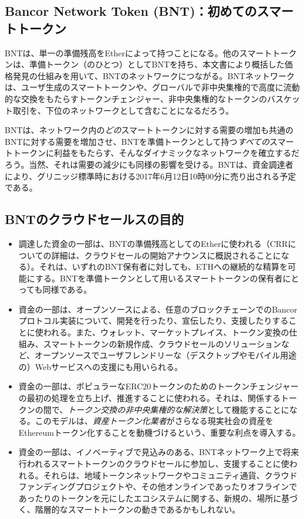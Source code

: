 \documentclass{jsarticle}
\begin{document}
  \subsection{Bancor Network Token (BNT)：初めてのスマートトークン}

  BNTは、単一の準備残高をEtherによって持つことになる。他のスマートトークンは、準備トークン（のひとつ）としてBNTを持ち、本文書により概括した価格発見の仕組みを用いて、BNTのネットワークにつながる。BNTネットワークは、ユーザ生成のスマートトークンや、グローバルで非中央集権的で高度に流動的な交換をもたらすトークンチェンジャー、非中央集権的なトークンのバスケット取引を、下位のネットワークとして含むことになるだろう。

  BNTは、ネットワーク内の\emph{どの}スマートトークンに対する需要の増加も共通のBNTに対する需要を増加させ、BNTを準備トークンとして持つ\emph{すべての}スマートトークンに利益をもたらす、そんなダイナミックなネットワークを確立するだろう。当然、それは需要の減少にも同様の影響を受ける。BNTは、資金調達者により、グリニッジ標準時における2017年6月12日10時00分に売り出される予定である。

  \subsection{BNTのクラウドセールスの目的}

  \begin{itemize}
    \item 調達した資金の一部は、BNTの準備残高としてのEtherに使われる（CRRについての詳細は、クラウドセールの開始アナウンスに概説されることになる）。それは、いずれのBNT保有者に対しても、ETHへの継続的な精算を可能にする。BNTを準備トークンとして用いるスマートトークンの保有者にとっても同様である。
    \item 資金の一部は、オープンソースによる、任意のブロックチェーンでのBancorプロトコル実装について、開発を行ったり、宣伝したり、支援したりすることに使われる。また、ウォレット、マーケットプレイス、トークン変換の仕組み、スマートトークンの新規作成、クラウドセールのソリューションなど、オープンソースでユーザフレンドリーな（デスクトップやモバイル用途の）Webサービスへの支援にも用いられる。
    \item 資金の一部は、ポピュラーなERC20トークンのためのトークンチェンジャーの最初の処理を立ち上げ、推進することに使われる。それは、関係するトークンの間で、\emph{トークン交換の非中央集権的な解決策}として機能することになる。このモデルは、\emph{資産トークン化業者}がさらなる現実社会の資産をEthereumトークン化することを動機づけるという、重要な利点を導入する。
    \item 資金の一部は、イノベーティブで見込みのある、BNTネットワーク上で将来行われるスマートトークンのクラウドセールに参加し、支援することに使われる。それらは、地域トークンネットワークやコミュニティ通貨、クラウドファンディングプロジェクトや、その他オンラインであったりオフラインであったりのトークンを元にしたエコシステムに関する、新規の、場所に基づく、階層的なスマートトークンの動きであるかもしれない。
  \end{itemize}
\end{document}
